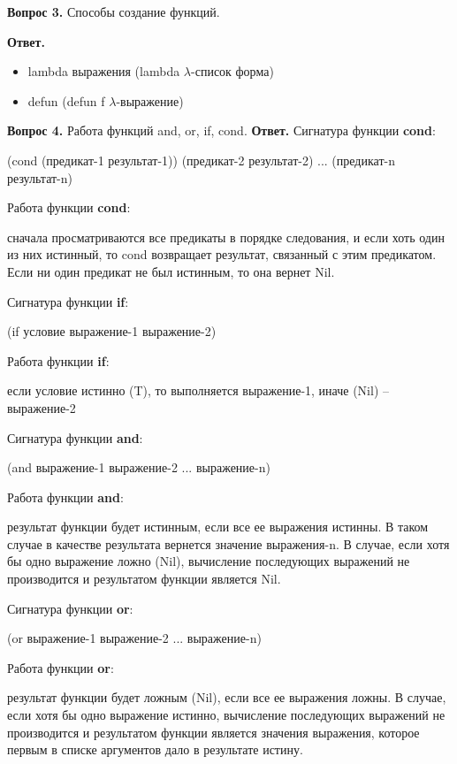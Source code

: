 \textbf{Вопрос 3.} Способы создание функций.

\textbf{Ответ.}
\begin{itemize}
	\item lambda выражения (lambda $\lambda$-список форма)
	\item defun (defun f $\lambda$-выражение)
\end{itemize}

\textbf{Вопрос 4.} Работа функций and, or, if, cond. \newline
\indent\textbf{Ответ. }
Сигнатура функции \textbf{cond}:

\indent(cond (предикат-1 результат-1)) \newline
\indent(предикат-2 результат-2) \newline
\indent...\newline
\indent(предикат-n результат-n)\newline

\indent Работа функции \textbf{cond}: 

сначала просматриваются все предикаты в порядке следования, и если хоть один из них истинный, то cond возвращает результат, связанный с этим предикатом. Если ни один предикат не был истинным, то она вернет Nil. 

Сигнатура функции \textbf{if}: 

(if условие выражение-1 выражение-2)\newline

\indent Работа функции \textbf{if}: 

если условие истинно (T), то выполняется выражение-1, иначе (Nil) – выражение-2\newline

Сигнатура функции \textbf{and}: 

(and выражение-1 выражение-2 ... выражение-n)\newline

\indent Работа функции \textbf{and}: 

результат функции будет истинным, если все ее выражения истинны. В таком случае в качестве результата вернется значение выражения-n. В случае, если хотя бы одно выражение ложно (Nil), вычисление последующих выражений не производится и результатом функции является Nil.\newline

Сигнатура функции \textbf{or}: 

(or выражение-1 выражение-2 ... выражение-n)\newline

Работа функции \textbf{or}: 

результат функции будет ложным (Nil), если все ее выражения ложны. В случае, если хотя бы одно выражение истинно, вычисление последующих выражений не производится и результатом функции является значения выражения, которое первым в списке аргументов дало в результате истину.\newline